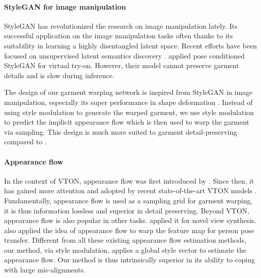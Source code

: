 \documentclass[10pt,twocolumn,letterpaper]{article}
\begin{document}
\vspace{-0.4cm}
\paragraph{StyleGAN for image manipulation}   StyleGAN \cite{karras2019style, karras2020analyzing} has revolutionized the research on image manipulation \cite{shen2020interfacegan, yang2021semantic, or2020lifespan} lately.  Its successful application on the image manipulation tasks often thanks to its suitability in learning a highly disentangled latent space. Recent efforts have been  focused on  unsupervised latent semantics discovery \cite{shen2021closed,cherepkov2021navigating, tzelepis2021warpedganspace}. \cite{lewis2021tryongan} applied pose conditioned StyleGAN for virtual try-on. However, their model cannot preserve garment details and is slow during inference.

The design of our garment warping network is inspired from StyleGAN in image manipulation, especially its super performance in shape deformation \cite{shen2021closed, or2020lifespan}. Instead of using style modulation to generate the warped garment, we use style modulation to predict the implicit appearance flow which is then used to warp the garment via sampling. This design is much more suited to garment detail-preserving compared to \cite{lewis2021tryongan}.
\vspace{-0.4cm}
\paragraph{Appearance flow} In the context of VTON, appearance flow was first introduced by \cite{han2019clothflow}. Since then, it has gained more attention and adopted by recent state-of-the-art VTON models \cite{ge2021parser, chopra2021zflow}. Fundamentally, appearance flow is used as a sampling grid for garment warping, it is thus information lossless and superior in detail preserving. 
Beyond VTON, appearance flow is also popular in other tasks. \cite{zhou2016view} applied it for novel view synthesis. \cite{ren2020deep, albahar2021pose} also applied the idea of appearance flow to warp the feature map for person pose transfer.
 Different from all these existing appearance flow estimation methods, our method, via style modulation, applies a global style vector to estimate the appearance flow. Our method is thus intrinsically superior in its ability to coping with large mis-alignments.
\end{document}
